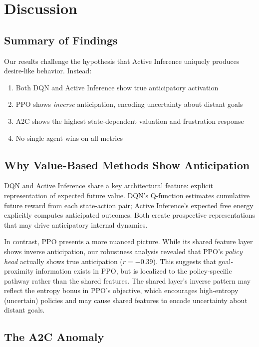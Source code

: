 \documentclass{article}
\begin{document}
\section{Discussion}

\subsection{Summary of Findings}

Our results challenge the hypothesis that Active Inference uniquely produces desire-like behavior. Instead:
\begin{enumerate}
    \item Both DQN and Active Inference show true anticipatory activation
    \item PPO shows \textit{inverse} anticipation, encoding uncertainty about distant goals
    \item A2C shows the highest state-dependent valuation and frustration response
    \item No single agent wins on all metrics
\end{enumerate}

\subsection{Why Value-Based Methods Show Anticipation}

DQN and Active Inference share a key architectural feature: explicit representation of expected future value. DQN's Q-function estimates cumulative future reward from each state-action pair; Active Inference's expected free energy explicitly computes anticipated outcomes. Both create prospective representations that may drive anticipatory internal dynamics.

In contrast, PPO presents a more nuanced picture. While its shared feature layer shows inverse anticipation, our robustness analysis revealed that PPO's \textit{policy head} actually shows true anticipation ($r = -0.39$). This suggests that goal-proximity information exists in PPO, but is localized to the policy-specific pathway rather than the shared features. The shared layer's inverse pattern may reflect the entropy bonus in PPO's objective, which encourages high-entropy (uncertain) policies and may cause shared features to encode uncertainty about distant goals.

\subsection{The A2C Anomaly}
\end{document}
